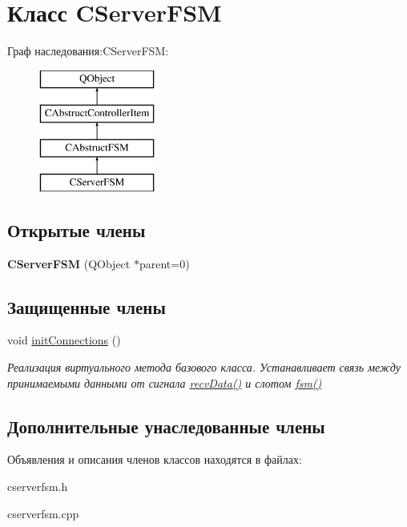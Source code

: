 \hypertarget{class_c_server_f_s_m}{}\section{Класс C\+Server\+F\+SM}
\label{class_c_server_f_s_m}
Граф наследования\+:C\+Server\+F\+SM\+:\begin{figure}[H]
\begin{center}
\leavevmode
\includegraphics[height=4.000000cm]{class_c_server_f_s_m}
\end{center}
\end{figure}
\subsection*{Открытые члены}
\begin{DoxyCompactItemize}
\item 
\hypertarget{class_c_server_f_s_m_a6d2328de2b1e2725e4a569e146b077f3}{}\label{class_c_server_f_s_m_a6d2328de2b1e2725e4a569e146b077f3} 
{\bfseries C\+Server\+F\+SM} (Q\+Object $\ast$parent=0)
\end{DoxyCompactItemize}
\subsection*{Защищенные члены}
\begin{DoxyCompactItemize}
\item 
\hypertarget{class_c_server_f_s_m_ae0e6a994505c26e60b718af9989bea77}{}\label{class_c_server_f_s_m_ae0e6a994505c26e60b718af9989bea77} 
void \hyperlink{class_c_server_f_s_m_ae0e6a994505c26e60b718af9989bea77}{init\+Connections} ()
\begin{DoxyCompactList}\small\item\em Реализация виртуального метода базового класса. Устанавливает связь между принимаемыми данными от сигнала \hyperlink{class_c_abstruct_controller_item_a6898e48061cb0cac2065f8193bd386c1}{recv\+Data()} и слотом \hyperlink{class_c_abstruct_f_s_m_ae06497e1f93385cd6c20eaa84fc253c1}{fsm()} \end{DoxyCompactList}\end{DoxyCompactItemize}
\subsection*{Дополнительные унаследованные члены}


Объявления и описания членов классов находятся в файлах\+:\begin{DoxyCompactItemize}
\item 
cserverfsm.\+h\item 
cserverfsm.\+cpp\end{DoxyCompactItemize}
